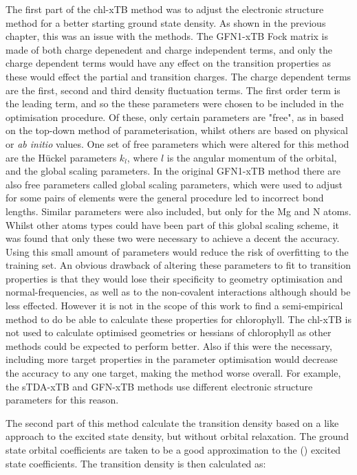 The first part of the chl-xTB method was to adjust the electronic structure method
for a better starting ground state density. As shown in the previous chapter, this
was an issue with the \dxtb methods. The GFN1-xTB Fock matrix is made of both charge
depenedent and charge independent terms, and only the charge dependent terms would
have any effect on the transition properties as these would effect the partial and
transition charges. The charge dependent terms are the first, second and third 
density fluctuation terms. The first order term is the leading term, and so the 
these parameters were chosen to be included in the optimisation procedure. Of these,
only certain parameters are "free", as in based on the top-down method of parameterisation,
whilst others are based on physical or \emph{ab initio} values. One set of free parameters 
which were altered for this method are the H{\"u}ckel parameters $k_l$, where $l$
is the angular momentum of the orbital, and the global scaling parameters. In the
original GFN1-xTB method there are also free parameters called global scaling 
parameters, which were used to adjust for some pairs of elements were the general
procedure led to incorrect bond lengths. Similar parameters were also included, but
only for the Mg and N atoms. Whilst other atoms types could have been part of this
global scaling scheme, it was found that only these two were necessary to achieve
a decent the accuracy. Using this small amount of parameters would reduce the risk
of overfitting to the training set.
An obvious drawback of altering these parameters to fit to transition properties
is that they would lose their specificity to geometry optimisation and normal-frequencies,
as well as to the non-covalent interactions although should be less effected. However
it is not in the scope of this work to find a semi-empirical method to do be able
to calculate these properties for chlorophyll. The chl-xTB is not used to calculate
optimised geometries or hessians of chlorophyll as other methods could be expected 
to perform better. Also if this were the necessary, including more target properties
in the parameter optimisation would decrease the accuracy to any one target, making
the method worse overall. For example, the sTDA-xTB and GFN-xTB methods use different
electronic structure parameters for this reason.

The second part of this method calculate the transition density based on a \dscf
like approach to the excited state density, but without orbital relaxation. The
ground state orbital coefficients are taken to be a good approximation to the
(\Qy) excited state coefficients. The transition density is then calculated as:

